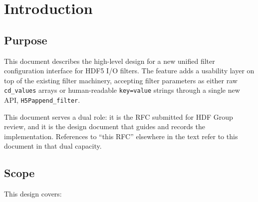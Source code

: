 \documentclass[../RFC-HDFG-2026-001.tex]{subfiles}
\begin{document}
\section{Introduction}
\label{sec:intro}

\subsection{Purpose}

This document describes the high-level design for a new unified filter
configuration interface for HDF5 I/O filters. The feature adds a usability
layer on top of the existing filter machinery, accepting filter parameters as
either raw \texttt{cd\_values} arrays or human-readable \texttt{key=value}
strings through a single new API, \texttt{H5Pappend\_filter}.

This document serves a dual role: it is the RFC submitted for HDF Group
review, and it is the design document that guides and records the
implementation. References to ``this RFC'' elsewhere in the text refer to
this document in that dual capacity.

\subsection{Scope}

This design covers:
\end{document}
